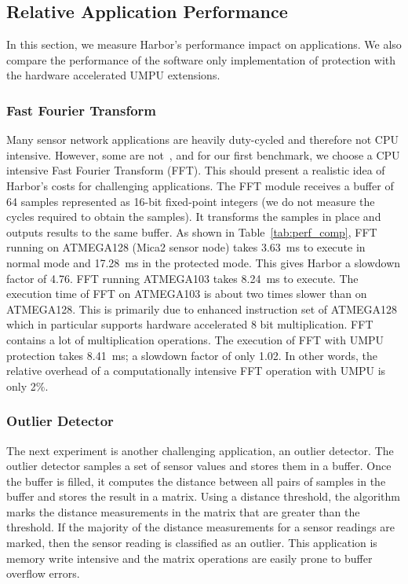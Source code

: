 \subsection{Relative Application Performance}
%
In this section, we measure Harbor's performance impact on
applications.
%
We also compare the performance of the software only implementation of
protection with the hardware accelerated UMPU extensions.
%
\subsubsection{Fast Fourier Transform}
%
Many sensor network applications are heavily duty-cycled and therefore
not CPU intensive.
%
However, some are not~\cite{ben06vango}, and for our first benchmark,
we choose a CPU intensive Fast Fourier Transform (FFT).  
%
This should present a realistic idea of Harbor's
costs for challenging applications.
%
The FFT module receives a buffer of 64 samples represented as 16-bit
fixed-point integers (we do not measure the cycles required to obtain the
samples).
%
It transforms the samples in place and outputs results to the same buffer.
%
As shown in Table~\ref{tab:perf_comp}, FFT running on ATMEGA128 (Mica2
sensor node) takes 3.63~ms to execute in normal mode and 17.28~ms in the
protected mode.
%
This gives Harbor a slowdown factor of 4.76.
%
FFT running ATMEGA103 takes 8.24~ms to execute.
%
The execution time of FFT on ATMEGA103 is about two times slower than
on ATMEGA128.
%
This is primarily due to enhanced instruction set of ATMEGA128 which
in particular supports hardware accelerated 8 bit multiplication.
%
FFT contains a lot of multiplication operations.
%
The execution of FFT with UMPU protection takes 8.41~ms; a slowdown
factor of only 1.02.
%
In other words, the relative overhead of a computationally intensive
FFT operation with UMPU is only 2\%.
%
\subsubsection{Outlier Detector}
The next experiment is another challenging application, an outlier detector.
%
The outlier detector samples a set of sensor values and stores them in a buffer.
%
Once the buffer is filled, it computes the distance between all pairs of samples in the buffer and stores the result in a matrix.
%
Using a distance threshold, the algorithm marks the distance measurements in the matrix that are greater than the threshold.
%
If the majority of the distance measurements for a sensor readings are marked, then the sensor reading is classified as an outlier.
%
This application is memory write intensive and the matrix operations are easily prone to buffer overflow errors.
%


